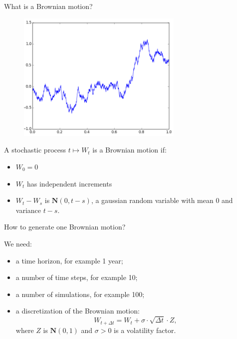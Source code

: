 \begin{frame}{What is a Brownian motion?}

\begin{figure}
		\centering
		\includegraphics[width=300]{Images/BrownianMotion.png}
\end{figure}
\FloatBarrier

\pause
A stochastic process $t \longmapsto W_t$ is a Brownian motion if: 

\begin{itemize}
	\item $W_0 = 0$
	\pause
	\item $W_t$ has independent increments
	\pause
	\item $W_t - W_s$ is $\textbf{N}(0, t-s)$, a gaussian random variable with mean 0 and variance $t-s$.
\end{itemize}
	
\end{frame}


\begin{frame}{How to generate one Brownian motion?}

We need:

\bigskip

\begin{itemize}
	\item a time horizon, for example 1 year;
	\pause
	\bigskip
	\item a number of time steps, for example 10;
	\pause
	\bigskip
	\item a number of simulations, for example 100;
	\pause
	\bigskip
	\item a discretization of the Brownian motion:
		\begin{displaymath}
			W_{t+\Delta t} = W_t + \sigma \cdot \sqrt{\Delta t} \cdot Z,
		\end{displaymath}
		\pause
		where $Z$ is $\textbf{N}(0,1)$ and $\sigma>0$ is a volatility factor.
\end{itemize}



\end{frame}


